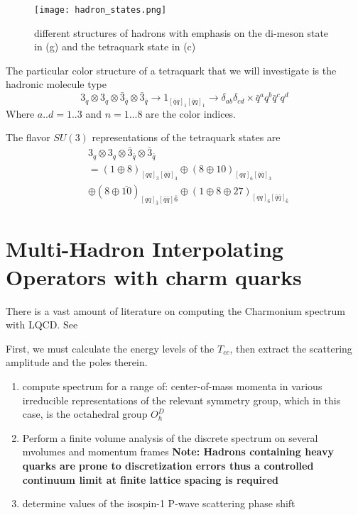 \begin{figure}[h]
    \texttt{[image: hadron\_states.png]}
    \caption{different structures of hadrons with emphasis on the di-meson state in (g) and the tetraquark state in (c)}
    \label{fig:figure6}
    \end{figure}
The particular color structure of a tetraquark that we will investigate is the hadronic molecule type 
\begin{equation}
    3_q \otimes 3_q \otimes \bar{3}_{\bar{q}} \otimes \bar{3}_{\bar{q}} \rightarrow 1_{[\bar{q}q]_1[\bar{q}q]_1} \rightarrow \delta_{ab} \delta_{cd} \times \bar{q}^aq^b\bar{q}^cq^d 
\end{equation}
Where $a..d = 1..3$ and $n=1...8$ are the color indices. 

The flavor $SU(3)$ representations of the tetraquark states are 
\begin{align}
& 3_q \otimes 3_q \otimes \bar{3}_{\bar{q}} \otimes \bar{3}_{\bar{q}} \nonumber \\
& = (1 \oplus 8)_{[qq]_{\bar{3}}[\bar{q}\bar{q}]_3} \oplus (8 \oplus 10)_{[qq]_6[\bar{q}\bar{q}]_3} \nonumber \\
& \oplus (8 \oplus \bar{10})_{[qq]_{\bar{3}}[\bar{q}\bar{q}]\bar{6}} \oplus (1 \oplus 8 \oplus 27)_{[qq]_6[\bar{q}\bar{q}]_{\bar{6}}}
\end{align}

\section{Multi-Hadron Interpolating Operators with charm quarks}
There is a vast amount of literature on computing the Charmonium spectrum with LQCD. See 

First, we must calculate the energy levels of the $T_{cc}$, then extract the scattering amplitude and the poles therein. 

\begin{enumerate}
    \item compute spectrum for a range of:
    \subitem center-of-mass momenta 
    \subitem in various irreducible representations of the relevant symmetry group, which in this case, is the octahedral group $O_h^D$ 
    \item Perform a finite volume analysis of the discrete spectrum on several mvolumes and momentum frames
        \subitem \textbf{Note: Hadrons containing heavy quarks are prone to discretization errors thus a controlled continuum limit at finite lattice spacing is required} 
    \item determine values of the isospin-1 P-wave scattering phase shift 
\end{enumerate}
    
